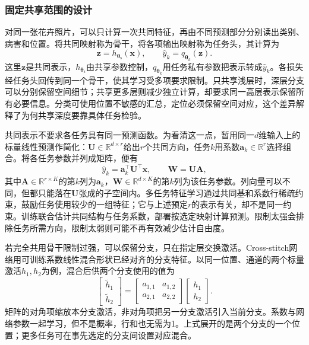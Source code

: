 \subsubsection{固定共享范围的设计}
\label{sec:ket-sharing-fixed}

对同一张花卉照片，可以只计算一次共同特征，再由不同预测部分分别读出类别、病害和位置。将共同映射称为骨干，将各项输出映射称为任务头，其计算为
\begin{equation}
  \bm z=h_{\bm{\theta}_{\mathrm{s}}}(\bm x),
  \qquad
  \hat y_k=q_{\bm{\theta}_k}(\bm z).
  \label{eq:ket-sharing-backbone}
\end{equation}
这里$\bm z$是共同表示，$h_{\bm{\theta}_{\mathrm{s}}}$由共享参数控制，$q_{\bm{\theta}_k}$用任务私有参数把表示转成$\hat y_k$。各损失经任务头回传到同一个骨干，使其学习受多项要求限制。只共享浅层时，深层分支可以分别保留空间细节；共享更多层则减少独立计算，却要求同一高层表示保留所有必要信息。分类可使用位置不敏感的汇总，定位必须保留空间对应，这个差异解释了为何共享深度要靠具体任务检验。

共同表示不要求各任务具有同一预测函数。为看清这一点，暂用同一$d$维输入上的标量线性预测作简化：$\bm U\in\mathbb R^{d\times r}$给出$r$个共同方向，任务$k$用系数$\bm a_k\in\mathbb R^r$选择组合。将各任务参数并列成矩阵，便有
\begin{equation}
  \hat y_k=\bm a_k^{\top}\bm U^{\top}\bm x,
  \qquad
  \bm W=\bm U\bm A,
  \label{eq:ket-sharing-subspace}
\end{equation}
其中$\bm A\in\mathbb R^{r\times K}$的第$k$列为$\bm a_k$，$\bm W\in\mathbb R^{d\times K}$的第$k$列为该任务参数。列向量可以不同，但都只能落在$\bm U$张成的子空间内。多任务特征学习通过共同基和系数行稀疏约束，鼓励任务使用较少的一组特征；它与上述预定$r$的表示有关，却不是同一约束。训练联合估计共同结构与任务系数，部署按选定映射计算预测。限制太强会排除任务所需方向，限制太弱则可能不再有效减少估计自由度。

若完全共用骨干限制过强，可以保留分支，只在指定层交换激活。Cross-stitch网络用可训练系数线性混合形状已经对齐的分支特征。以同一位置、通道的两个标量激活$h_1,h_2$为例，混合后供两个分支使用的值为
\begin{equation}
  \begin{bmatrix}
    \widetilde h_1\\ \widetilde h_2
  \end{bmatrix}
  =
  \begin{bmatrix}
    a_{1,1}&a_{1,2}\\a_{2,1}&a_{2,2}
  \end{bmatrix}
  \begin{bmatrix}
    h_1\\h_2
  \end{bmatrix}.
  \label{eq:ket-sharing-cross-stitch}
\end{equation}
矩阵的对角项缩放本分支激活，非对角项把另一分支激活引入当前分支。系数与网络参数一起学习，但不是概率，行和也无需为1。上式展开的是两个分支的一个位置；更多任务可在事先选定的分支间设置对应混合。

